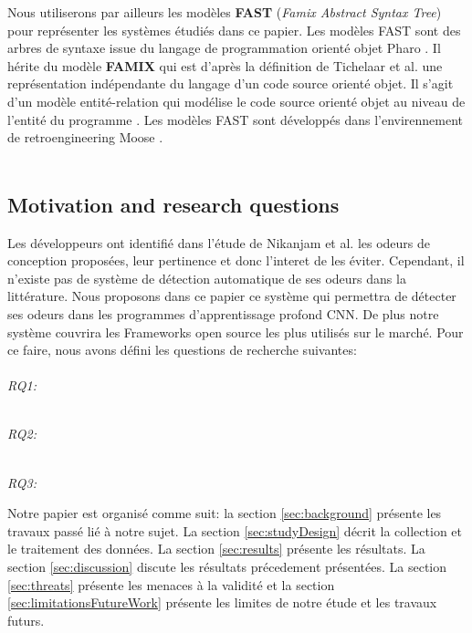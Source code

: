 Nous utiliserons par ailleurs les modèles \textbf{FAST} (\emph{Famix Abstract Syntax Tree}) pour représenter les systèmes étudiés dans ce papier. Les modèles
FAST sont des arbres de syntaxe issue du langage de programmation orienté objet
Pharo \cite{black2010pharo, bergel2013deep, zaitsev2020characterizing}. Il hérite du modèle \textbf{FAMIX} qui est d'après la définition de
Tichelaar et al. une représentation indépendante du langage d'un code source
orienté objet. Il s'agit d'un modèle entité-relation qui modélise le code source
orienté objet au niveau de l'entité du programme \cite{891485} \cite{demeyer1999famix}.
Les modèles FAST sont développés dans l'envirennement de retroengineering Moose \cite{ducasse2000moose}.\\\\



\subsection{Motivation and research questions}
Les développeurs ont identifié dans l'étude de Nikanjam et al. les odeurs de
conception proposées, leur pertinence et donc l'interet de les éviter.
Cependant, il n'existe pas de système de détection automatique de ses odeurs
dans la littérature. Nous proposons dans ce papier ce système qui
permettra de détecter ses odeurs dans les programmes d'apprentissage profond
CNN. De plus notre système couvrira les Frameworks open source les plus utilisés sur le
marché. Pour ce faire, nous avons défini les questions de recherche suivantes:\\

\emph{\\RQ1:\RQOne} %

\emph{\\RQ2:\RQTwo} %

\emph{\\RQ3:\RQThree} %

Notre papier est organisé comme suit: la section \ref{sec:background} présente
les travaux passé lié à notre sujet. La section \ref{sec:studyDesign} décrit la
collection et le traitement des données. La section \ref{sec:results} présente
les résultats. La section \ref{sec:discussion} discute les
résultats précedement présentées. La section \ref{sec:threats} présente les menaces à la
validité et la section \ref{sec:limitationsFutureWork} présente les limites de notre étude et les travaux futurs.
